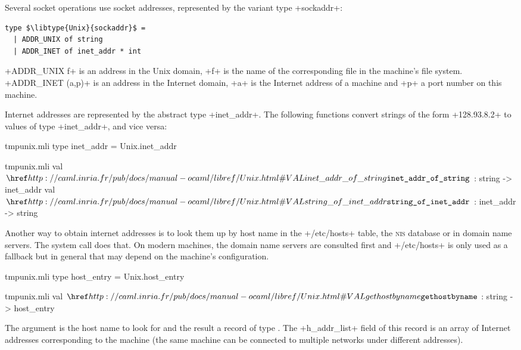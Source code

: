Several socket operations use socket addresses, represented by the variant
type \ml+sockaddr+:
\begin{lstlisting}
type $\libtype{Unix}{sockaddr}$ =
  | ADDR_UNIX of string
  | ADDR_INET of inet_addr * int
\end{lstlisting}
\ml+ADDR_UNIX f+ is an address in the Unix domain, \ml+f+ is
the name of the corresponding file in the machine's file
system. \ml+ADDR_INET (a,p)+ is an address in the Internet domain,
\ml+a+ is the Internet address of a machine and \ml+p+ a port
number on this machine.

Internet addresses are represented by the abstract type
\ml+inet_addr+. The following functions convert strings of the form
\ml+128.93.8.2+ to values of type \ml+inet_addr+, and vice versa:
%
\begin{codefile}{tmpunix.mli}
type inet_addr = Unix.inet_addr
\end{codefile}
%
\begin{listingcodefile}{tmpunix.mli}
val $\indexlibvalue{Unix}{inet\_addr\_of\_string}$ : string -> inet_addr
val $\indexlibvalue{Unix}{string\_of\_inet\_addr}$ : inet_addr -> string
\end{listingcodefile}
%

Another way to obtain internet addresses is to look them up by host name in
the \ml+/etc/hosts+ table, the \textsc{nis} database or in domain name
  servers. The system call  does that. On
  modern machines, the domain name servers are consulted first and
  \ml+/etc/hosts+ is only used as a fallback but in general that may
  depend on the machine's configuration.
%
\begin{codefile}{tmpunix.mli}
type host_entry = Unix.host_entry
\end{codefile}
%
\begin{listingcodefile}{tmpunix.mli}
val $\libvalue{Unix}{gethostbyname}$ : string -> host_entry
\end{listingcodefile}
% 
The argument is the host name to look for and the result a record of
type . The \ml+h_addr_list+ field of this
record is an array of Internet addresses corresponding to the machine
(the same machine can be connected to multiple networks under
different addresses).

